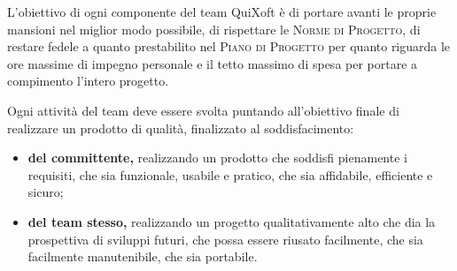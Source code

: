 \documentclass[11pt,a4paper]{article}
\begin{document}
L'obiettivo di ogni componente del team QuiXoft è di portare avanti le proprie mansioni nel miglior modo possibile, di rispettare le \textsc{Norme di Progetto}, di restare fedele a quanto prestabilito nel \textsc{Piano di Progetto} per quanto riguarda le ore massime di impegno personale e il tetto massimo di spesa per portare a compimento l'intero progetto.

Ogni attività del team deve essere svolta puntando all'obiettivo finale di realizzare un prodotto di qualità, finalizzato al soddisfacimento:
\begin{itemize}
	\item \textbf{del committente,} realizzando un prodotto che soddisfi pienamente i requisiti, che sia funzionale, usabile e pratico, che sia affidabile, efficiente e sicuro;
	\item \textbf{del team stesso,} realizzando un progetto qualitativamente alto che dia la prospettiva di sviluppi futuri, che possa essere riusato facilmente, che sia facilmente manutenibile, che sia portabile.
\end{itemize}
\end{document}
